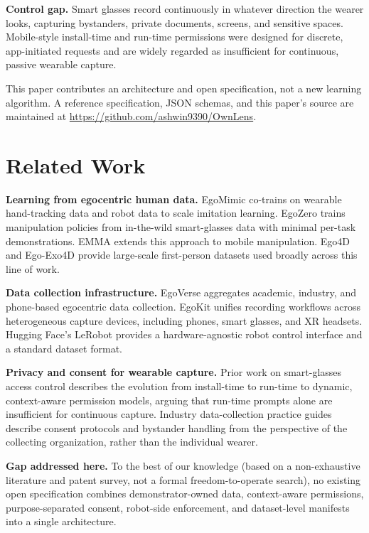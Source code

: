 \documentclass[10pt,twocolumn,letterpaper]{article}
\begin{document}
\textbf{Control gap.} Smart glasses record continuously in whatever direction the wearer looks, capturing bystanders, private documents, screens, and sensitive spaces. Mobile-style install-time and run-time permissions were designed for discrete, app-initiated requests and are widely regarded as insufficient for continuous, passive wearable capture.

This paper contributes an architecture and open specification, not a new learning algorithm. A reference specification, JSON schemas, and this paper's source are maintained at \url{https://github.com/ashwin9390/OwnLens}.

\section{Related Work}

\textbf{Learning from egocentric human data.} EgoMimic co-trains on wearable hand-tracking data and robot data to scale imitation learning. EgoZero trains manipulation policies from in-the-wild smart-glasses data with minimal per-task demonstrations. EMMA extends this approach to mobile manipulation. Ego4D and Ego-Exo4D provide large-scale first-person datasets used broadly across this line of work.

\textbf{Data collection infrastructure.} EgoVerse aggregates academic, industry, and phone-based egocentric data collection. EgoKit unifies recording workflows across heterogeneous capture devices, including phones, smart glasses, and XR headsets. Hugging Face's LeRobot provides a hardware-agnostic robot control interface and a standard dataset format.

\textbf{Privacy and consent for wearable capture.} Prior work on smart-glasses access control describes the evolution from install-time to run-time to dynamic, context-aware permission models, arguing that run-time prompts alone are insufficient for continuous capture. Industry data-collection practice guides describe consent protocols and bystander handling from the perspective of the collecting organization, rather than the individual wearer.

\textbf{Gap addressed here.} To the best of our knowledge (based on a non-exhaustive literature and patent survey, not a formal freedom-to-operate search), no existing open specification combines demonstrator-owned data, context-aware permissions, purpose-separated consent, robot-side enforcement, and dataset-level manifests into a single architecture.
\end{document}
